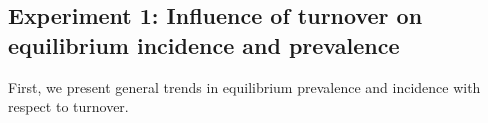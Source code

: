 \subsection{Experiment 1: Influence of turnover on equilibrium incidence and prevalence}
\label{ss:res-1}
First, we present general trends in equilibrium prevalence and incidence
with respect to turnover.
